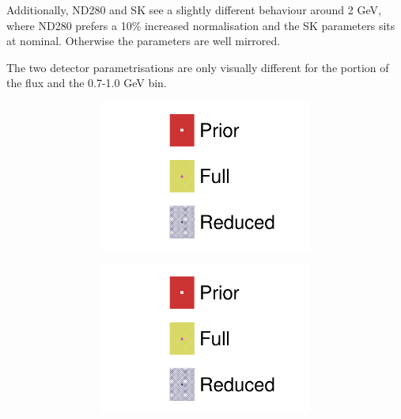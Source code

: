 Additionally, ND280 and SK see a slightly different behaviour around 2 GeV, where ND280 prefers a 10\% increased normalisation and the SK parameters sits at nominal. Otherwise the parameters are well mirrored.

The two detector parametrisations are only visually different for the \nuebar portion of the flux and the 0.7-1.0 GeV \numubar bin.
\begin{figure}[h]
	\centering
		\begin{subfigure}[t]{\textwidth}
	\begin{subfigure}[t]{0.24\textwidth}
		\includegraphics[width=\textwidth,page=6, trim={0mm 0mm 0mm 9mm}, clip]{figures/mach3/2018/data/2018a_FixedCov_FullCov_Mpi_Data_merg_2018a_FixedCov_RedCov_Mpi_Data_merge}
	\end{subfigure}
	\begin{subfigure}[t]{0.24\textwidth}
		\includegraphics[width=\textwidth,page=7, trim={0mm 0mm 0mm 9mm}, clip]{figures/mach3/2018/data/2018a_FixedCov_FullCov_Mpi_Data_merg_2018a_FixedCov_RedCov_Mpi_Data_merge}

\end{subfigure}
\end{subfigure}
\end{figure}
